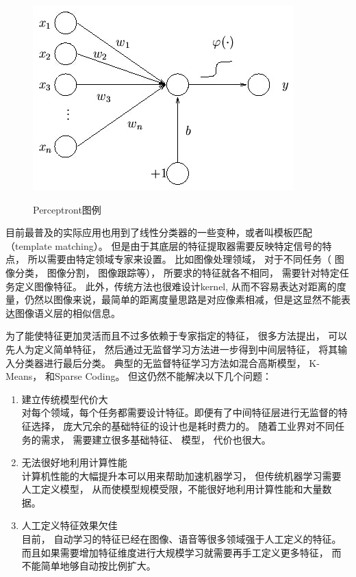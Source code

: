 \begin{figure}[htb]
  \centering
  \includegraphics[scale=0.9]{Pictures/CNN/perceptron.jpg}\\
  \caption{Perceptront图例\cite{rosenblatt1960perceptron}}\label{fig:perceptron}
\end{figure}

目前最普及的实际应用也用到了线性分类器的一些变种，或者叫模板匹配（template matching）。 但是由于其底层的特征提取器需要反映特定信号的特点， 所以需要由特定领域专家来设置。 比如图像处理领域， 对于不同任务（ 图像分类， 图像分割， 图像跟踪等）， 所要求的特征就各不相同， 需要针对特定任务定义图像特征。 此外，传统方法也很难设计kernel, 从而不容易表达对距离的度量，仍然以图像来说，最简单的距离度量思路是对应像素相减，但是这显然不能表达图像语义层的相似信息。

为了能使特征更加灵活而且不过多依赖于专家指定的特征， 很多方法提出， 可以先人为定义简单特征， 然后通过无监督学习方法进一步得到中间层特征， 将其输入分类器进行最后分类。
典型的无监督特征学习方法如混合高斯模型\cite{jeong2004image,gray2001gauss,gauvain1992bayesian,reynolds2000speaker,reynolds1995robust, zivkovic2004improved,lee2005effective,yang1999gaussian}， K-Means\cite{liu2007computational,netzer2011reading,coates2011text,dy2004feature,coates2012learning}， 和Sparse Coding\cite{yang2009linear,boureau2008sparse,coates2011importance,coates2011analysis,gao2010local,mairal2010online}。 但这仍然不能解决以下几个问题：

\begin{enumerate}
	\item 建立传统模型代价大\\
	对每个领域，每个任务都需要设计特征。即便有了中间特征层进行无监督的特征选择， 庞大冗余的基础特征的设计也是耗时费力的。 随着工业界对不同任务的需求， 需要建立很多基础特征、 模型， 代价也很大。
	\item 无法很好地利用计算性能\\
	计算机性能的大幅提升本可以用来帮助加速机器学习， 但传统机器学习需要人工定义模型， 从而使模型规模受限，不能很好地利用计算性能和大量数据。 
	
	\item 人工定义特征效果欠佳\\
	目前， 自动学习的特征已经在图像、语音等很多领域强于人工定义的特征。 而且如果需要增加特征维度进行大规模学习就需要再手工定义更多特征， 而不能简单地够自动按比例扩大。
	
\end{enumerate}


